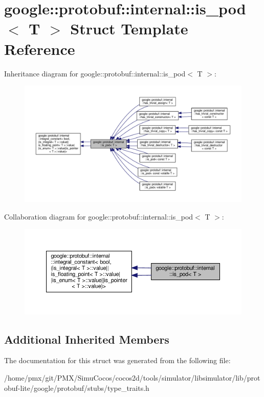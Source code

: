 \hypertarget{structgoogle_1_1protobuf_1_1internal_1_1is__pod}{}\section{google\+:\+:protobuf\+:\+:internal\+:\+:is\+\_\+pod$<$ T $>$ Struct Template Reference}
\label{structgoogle_1_1protobuf_1_1internal_1_1is__pod}


Inheritance diagram for google\+:\+:protobuf\+:\+:internal\+:\+:is\+\_\+pod$<$ T $>$\+:
\nopagebreak
\begin{figure}[H]
\begin{center}
\leavevmode
\includegraphics[width=350pt]{structgoogle_1_1protobuf_1_1internal_1_1is__pod__inherit__graph}
\end{center}
\end{figure}


Collaboration diagram for google\+:\+:protobuf\+:\+:internal\+:\+:is\+\_\+pod$<$ T $>$\+:
\nopagebreak
\begin{figure}[H]
\begin{center}
\leavevmode
\includegraphics[width=350pt]{structgoogle_1_1protobuf_1_1internal_1_1is__pod__coll__graph}
\end{center}
\end{figure}
\subsection*{Additional Inherited Members}


The documentation for this struct was generated from the following file\+:\begin{DoxyCompactItemize}
\item 
/home/pmx/git/\+P\+M\+X/\+Simu\+Cocos/cocos2d/tools/simulator/libsimulator/lib/protobuf-\/lite/google/protobuf/stubs/type\+\_\+traits.\+h\end{DoxyCompactItemize}
